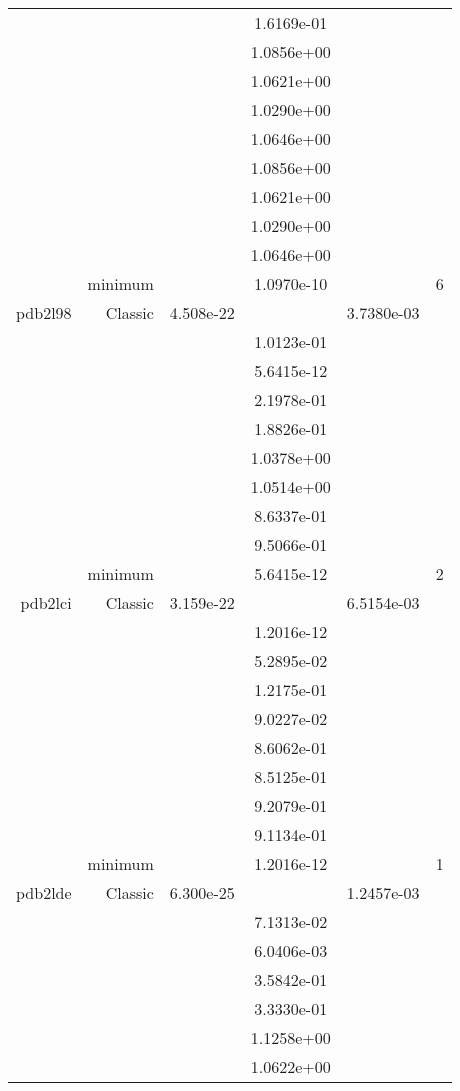 \begin{xltabular}{\textwidth}{r|rS[table-format=1.3e+2]S[table-format=1.4e+2]S[table-format=1.4e+2]S[table-format=-1.5]}
&  &  & 1.6169e-01 & & \\
&  &  & 1.0856e+00 & & \\
&  &  & 1.0621e+00 & & \\
&  &  & 1.0290e+00 & & \\
&  &  & 1.0646e+00 & & \\
&  &  & 1.0856e+00 & & \\
&  &  & 1.0621e+00 & & \\
&  &  & 1.0290e+00 & & \\
&  &  & 1.0646e+00 & & \\
& minimum &  & 1.0970e-10 & & 6 \\  \addlinespace
pdb2l98 & Classic & 4.508e-22 &  & 3.7380e-03 & \\
&  &  & 1.0123e-01 & & \\
&  &  & 5.6415e-12 & & \\
&  &  & 2.1978e-01 & & \\
&  &  & 1.8826e-01 & & \\
&  &  & 1.0378e+00 & & \\
&  &  & 1.0514e+00 & & \\
&  &  & 8.6337e-01 & & \\
&  &  & 9.5066e-01 & & \\
& minimum &  & 5.6415e-12 & & 2 \\  \addlinespace
pdb2lci & Classic & 3.159e-22 &  & 6.5154e-03 & \\
&  &  & 1.2016e-12 & & \\
&  &  & 5.2895e-02 & & \\
&  &  & 1.2175e-01 & & \\
&  &  & 9.0227e-02 & & \\
&  &  & 8.6062e-01 & & \\
&  &  & 8.5125e-01 & & \\
&  &  & 9.2079e-01 & & \\
&  &  & 9.1134e-01 & & \\
& minimum &  & 1.2016e-12 & & 1 \\  \addlinespace
pdb2lde & Classic & 6.300e-25 &  & 1.2457e-03 & \\
&  &  & 7.1313e-02 & & \\
&  &  & 6.0406e-03 & & \\
&  &  & 3.5842e-01 & & \\
&  &  & 3.3330e-01 & & \\
&  &  & 1.1258e+00 & & \\
&  &  & 1.0622e+00 & & \\

\end{xltabular}
